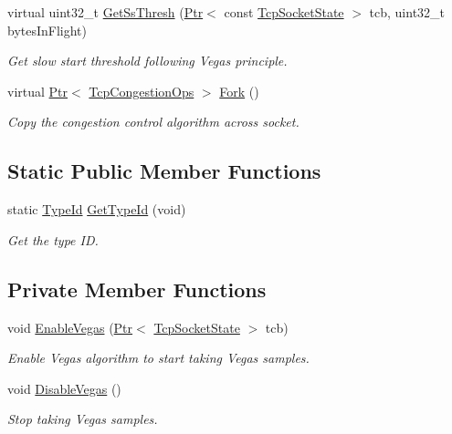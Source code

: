 \begin{DoxyCompactItemize}
virtual uint32\+\_\+t \hyperlink{classns3_1_1TcpVegas_af42952eb204ae641900b1d0ef4d39d97}{Get\+Ss\+Thresh} (\hyperlink{classns3_1_1Ptr}{Ptr}$<$ const \hyperlink{classns3_1_1TcpSocketState}{Tcp\+Socket\+State} $>$ tcb, uint32\+\_\+t bytes\+In\+Flight)
\begin{DoxyCompactList}\small\item\em Get slow start threshold following Vegas principle. \end{DoxyCompactList}\item 
virtual \hyperlink{classns3_1_1Ptr}{Ptr}$<$ \hyperlink{classns3_1_1TcpCongestionOps}{Tcp\+Congestion\+Ops} $>$ \hyperlink{classns3_1_1TcpVegas_afc91e9d8fb8814b417cf817538ec808d}{Fork} ()
\begin{DoxyCompactList}\small\item\em Copy the congestion control algorithm across socket. \end{DoxyCompactList}\end{DoxyCompactItemize}
\subsection*{Static Public Member Functions}
\begin{DoxyCompactItemize}
\item 
static \hyperlink{classns3_1_1TypeId}{Type\+Id} \hyperlink{classns3_1_1TcpVegas_af3bbd86cb35c0e00ab5230892a3aa3bd}{Get\+Type\+Id} (void)
\begin{DoxyCompactList}\small\item\em Get the type ID. \end{DoxyCompactList}\end{DoxyCompactItemize}
\subsection*{Private Member Functions}
\begin{DoxyCompactItemize}
\item 
void \hyperlink{classns3_1_1TcpVegas_a9598876615fdef3542af10ff541e1d40}{Enable\+Vegas} (\hyperlink{classns3_1_1Ptr}{Ptr}$<$ \hyperlink{classns3_1_1TcpSocketState}{Tcp\+Socket\+State} $>$ tcb)
\begin{DoxyCompactList}\small\item\em Enable Vegas algorithm to start taking Vegas samples. \end{DoxyCompactList}\item 
void \hyperlink{classns3_1_1TcpVegas_a246ed912a0fd29a246267511fb4d6c02}{Disable\+Vegas} ()
\begin{DoxyCompactList}\small\item\em Stop taking Vegas samples. \end{DoxyCompactList}\end{DoxyCompactItemize}
